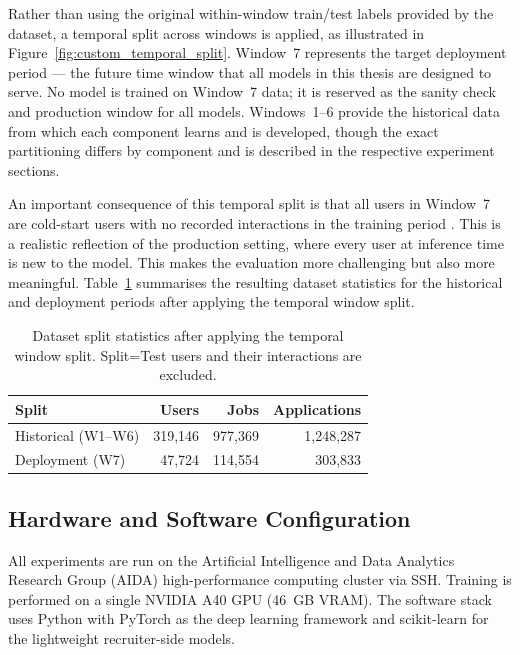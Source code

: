 Rather than using the original within-window train/test labels provided 
by the dataset, a temporal split across windows is applied, as 
illustrated in Figure~\ref{fig:custom_temporal_split}. Window~7 
represents the target deployment period --- the future time window that 
all models in this thesis are designed to serve. No model is trained on Window~7 data; it is reserved as the sanity check and production 
window for all models. Windows~1--6 
provide the historical data from which each component learns and is 
developed, though the exact partitioning differs by component and is
described in the respective experiment sections.

An important consequence of this temporal split is that all users in Window~7 are cold-start users with no recorded interactions in the training period \cite{nadimi2014coldstartproblem}. This is a realistic reflection of the production setting, where every user at inference time is new to the model. This makes the evaluation more challenging but also more meaningful. Table~\ref{tab:split_stats} summarises the resulting dataset statistics for the historical and deployment periods after applying the temporal window split. 

\begin{table}[htbp]
    \centering
    \caption{Dataset split statistics after applying the temporal 
window split. Split=Test users and their interactions are excluded.}
    \label{tab:split_stats}
    \begin{tabular}{lrrr}
        \toprule
        \textbf{Split} & \textbf{Users} & \textbf{Jobs} 
                       & \textbf{Applications} \\
        \midrule
        Historical (W1--W6) & 319,146 & 977,369 & 1,248,287  \\
        Deployment  (W7)     &  47,724 &  114,554 & 303,833  \\
        \bottomrule
    \end{tabular}
\end{table}

\subsection{Hardware and Software Configuration}
\label{sec:hardware}

All experiments are run on the Artificial Intelligence and Data Analytics Research Group (AIDA) high-performance computing cluster via SSH. Training is performed on a single NVIDIA A40 GPU (46~GB VRAM). The software stack uses Python with PyTorch as the deep learning framework and scikit-learn for the lightweight recruiter-side models. 

